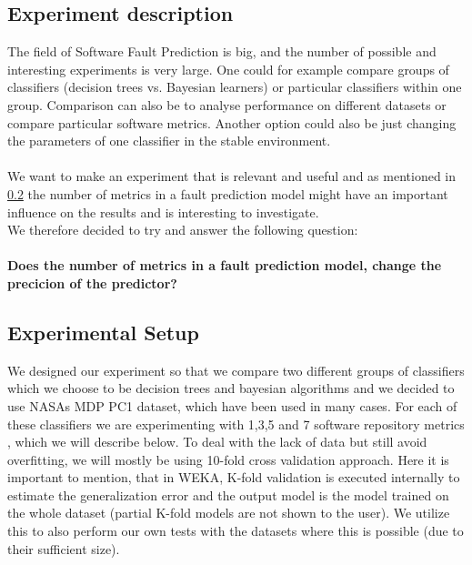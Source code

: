 \subsection{Experiment description}
The field of Software Fault Prediction is big, and the number of possible and interesting experiments is very large. One could for example compare groups of classifiers (decision trees vs. Bayesian learners) or particular classifiers within one group. Comparison can also be to analyse performance on different datasets or compare particular software metrics. Another option could also be just changing the parameters of one classifier in the stable environment.\\\\
We want to make an experiment that is relevant and useful and as mentioned in \ref{} the number of metrics in a fault prediction model might have an important influence on the results and is interesting to investigate. \\ We therefore decided to try and answer the following question:\\\\
\textbf{Does the number of metrics in a fault prediction model, change the precicion of the predictor?}\\
\subsection{Experimental Setup}
We designed our experiment so that we compare two different groups of classifiers which we choose to be decision trees and bayesian algorithms and we decided to use NASAs MDP PC1 dataset, which have been used in many cases. For each of these classifiers we are experimenting with 1,3,5 and 7 software repository metrics , which we will describe below. To deal with the lack of data but still avoid overfitting, we will mostly be using 10-fold cross validation approach. Here it is important to mention, that in WEKA, K-fold validation is executed internally to estimate the generalization error and the output model is the model trained on the whole dataset (partial K-fold models are not shown to the user). We utilize this to also perform our own tests with the datasets where this is possible (due to their sufficient size).
